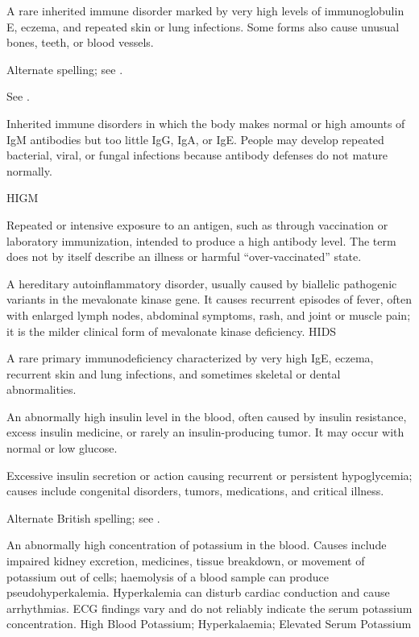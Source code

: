  A rare inherited immune disorder marked by very high levels of immunoglobulin E, eczema, and repeated skin or lung infections. Some forms also cause unusual bones, teeth, or blood vessels.

 Alternate spelling; see .

 See .

 Inherited immune disorders in which the body makes normal or high amounts of IgM antibodies but too little IgG, IgA, or IgE. People may develop repeated bacterial, viral, or fungal infections because antibody defenses do not mature normally.

\synonyms
HIGM

 Repeated or intensive exposure to an antigen, such as through vaccination or laboratory immunization, intended to produce a high antibody level. The term does not by itself describe an illness or harmful “over-vaccinated” state.

 A hereditary autoinflammatory disorder, usually caused by biallelic pathogenic variants in the mevalonate kinase gene. It causes recurrent episodes of fever, often with enlarged lymph nodes, abdominal symptoms, rash, and joint or muscle pain; it is the milder clinical form of mevalonate kinase deficiency.
\synonyms
HIDS

 A rare primary immunodeficiency characterized by very high IgE, eczema, recurrent skin and lung infections, and sometimes skeletal or dental abnormalities.

 An abnormally high insulin level in the blood, often caused by insulin resistance, excess insulin medicine, or rarely an insulin-producing tumor. It may occur with normal or low glucose.

 Excessive insulin secretion or action causing recurrent or persistent hypoglycemia; causes include congenital disorders, tumors, medications, and critical illness.

 Alternate British spelling; see .

 An abnormally high concentration of potassium in the blood. Causes include impaired kidney excretion, medicines, tissue breakdown, or movement of potassium out of cells; haemolysis of a blood sample can produce pseudohyperkalemia.
Hyperkalemia can disturb cardiac conduction and cause arrhythmias. ECG findings vary and do not reliably indicate the serum potassium concentration.
\synonyms
High Blood Potassium; Hyperkalaemia; Elevated Serum Potassium

